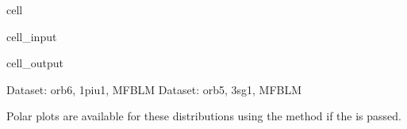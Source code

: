 \documentclass[letterpaper,10pt,english]{jupyterBook}
\begin{document}
\begin{sphinxuseclass}{cell}\begin{sphinxVerbatimInput}

\begin{sphinxuseclass}{cell_input}
\begin{sphinxVerbatim}[commandchars=\\\{\}]
     
\end{sphinxVerbatim}

\end{sphinxuseclass}\end{sphinxVerbatimInput}
\begin{sphinxVerbatimOutput}

\begin{sphinxuseclass}{cell_output}
\begin{sphinxVerbatim}[commandchars=\\\{\}]
Dataset: orb6, 1piu\PYGZhy{}1, MFBLM
Dataset: orb5, 3sg\PYGZhy{}1, MFBLM
\end{sphinxVerbatim}

\noindent{}

\noindent{}

\end{sphinxuseclass}\end{sphinxVerbatimOutput}

\end{sphinxuseclass}
\sphinxAtStartPar
Polar plots are available for these distributions using the  method if the  is passed.
\end{document}
